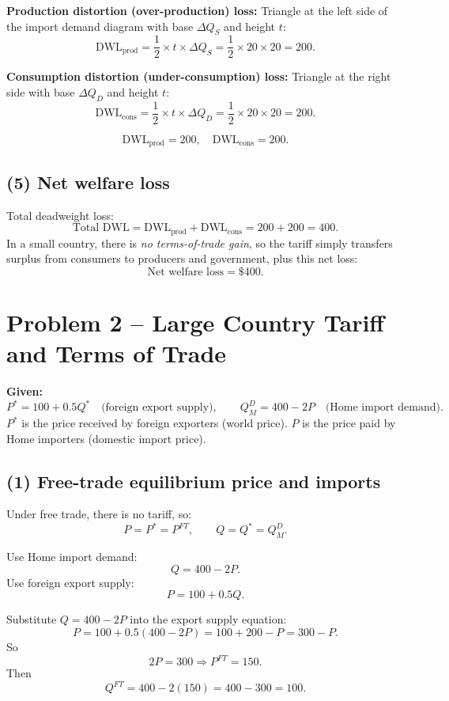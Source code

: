 \documentclass[12pt]{article}
\begin{document}
\textbf{Production distortion (over-production) loss:}
Triangle at the left side of the import demand diagram with base $\Delta Q_S$ and height $t$:
\[
\text{DWL}_{\text{prod}} = \frac{1}{2} \times t \times \Delta Q_S
= \frac{1}{2} \times 20 \times 20 = 200.
\]

\textbf{Consumption distortion (under-consumption) loss:}
Triangle at the right side with base $\Delta Q_D$ and height $t$:
\[
\text{DWL}_{\text{cons}} = \frac{1}{2} \times t \times \Delta Q_D
= \frac{1}{2} \times 20 \times 20 = 200.
\]

\[
\boxed{\text{DWL}_{\text{prod}} = 200,\quad \text{DWL}_{\text{cons}} = 200.}
\]

\subsection*{(5) Net welfare loss}

Total deadweight loss:
\[
\text{Total DWL} = \text{DWL}_{\text{prod}} + \text{DWL}_{\text{cons}} = 200 + 200 = 400.
\]
In a small country, there is \emph{no terms-of-trade gain}, so the tariff simply transfers surplus from consumers to producers and government, plus this net loss:
\[
\boxed{\text{Net welfare loss} = \$400.}
\]

\newpage

\section*{Problem 2 – Large Country Tariff and Terms of Trade}

\textbf{Given:}
\[
P^* = 100 + 0.5Q^* \quad \text{(foreign export supply)}, \qquad Q_M^D = 400 - 2P \quad \text{(Home import demand)}.
\]
$P^*$ is the price received by foreign exporters (world price).  
$P$ is the price paid by Home importers (domestic import price).

\subsection*{(1) Free-trade equilibrium price and imports}

Under free trade, there is no tariff, so:
\[
P = P^* = P^{FT}, \qquad Q = Q^* = Q_M^D.
\]

Use Home import demand:
\[
Q = 400 - 2P.
\]
Use foreign export supply:
\[
P = 100 + 0.5Q.
\]

Substitute $Q = 400 - 2P$ into the export supply equation:
\[
P = 100 + 0.5(400 - 2P) = 100 + 200 - P = 300 - P.
\]
So
\[
2P = 300 \Rightarrow P^{FT} = 150.
\]
Then
\[
Q^{FT} = 400 - 2(150) = 400 - 300 = 100.
\]
\end{document}
